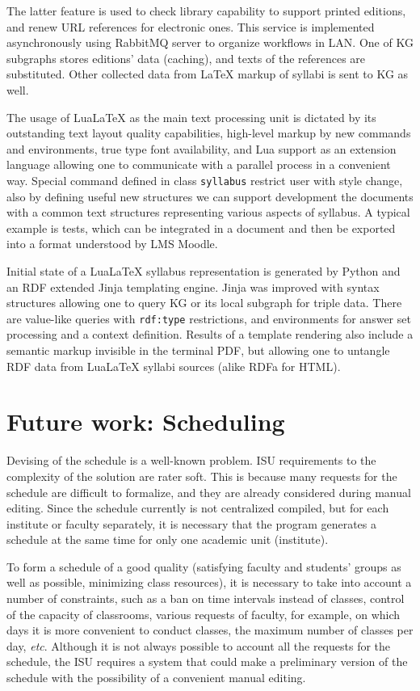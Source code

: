 \documentclass[
]{aiitart}
\providecommand{\LuaLaTeX}{Lua\LaTeX}
\begin{document}
The latter feature is used to check library capability to support printed editions, and renew URL references for electronic ones.  This service is implemented asynchronously using RabbitMQ server to organize workflows in LAN.  One of KG subgraphs stores editions' data (caching), and texts of the references are substituted.  Other collected data from \LaTeX{} markup of syllabi is sent to KG as well.

The usage of \LuaLaTeX{} as the main text processing unit is dictated by its outstanding text layout quality capabilities, high-level markup by new commands and environments, true type font availability, and Lua support as an extension language allowing one to communicate with a parallel process in a convenient way.  Special command defined in class \verb|syllabus| restrict user with style change, also by defining useful new structures we can support development the documents with a common text structures representing various aspects of syllabus.  A typical example is tests, which can be integrated in a document and then be exported into a format understood by LMS Moodle.

Initial state of a \LuaLaTeX{} syllabus representation is generated by Python and an RDF extended Jinja templating engine.  Jinja was improved with syntax structures allowing one to query KG or its local subgraph for triple data.  There are value-like queries with \verb|rdf:type| restrictions, and environments for answer set processing and a context definition.  Results of a template rendering also include a semantic markup invisible in the terminal PDF, but allowing one to untangle RDF data from \LuaLaTeX{} syllabi sources (alike RDFa for HTML).

\section{Future work: Scheduling}

Devising of the schedule is a well-known problem.  ISU requirements to the complexity of the solution are rater soft. This is because many requests for the schedule are difficult to formalize, and they are already considered during manual editing.  Since the schedule currently is not centralized compiled, but for each institute or faculty separately, it is necessary that the program generates a schedule at the same time for only one academic unit (institute).

To form a schedule of a good quality (satisfying faculty and students' groups as well as possible, minimizing class resources), it is necessary to take into account a number of constraints, such as a ban on time intervals instead of classes, control of the capacity of classrooms, various requests of faculty, for example, on which days it is more convenient to conduct classes, the maximum number of classes per day, \emph{etc}.  Although it is not always possible to account all the requests for the schedule, the ISU requires a system that could make a preliminary version of the schedule with the possibility of a convenient manual editing.
\end{document}

